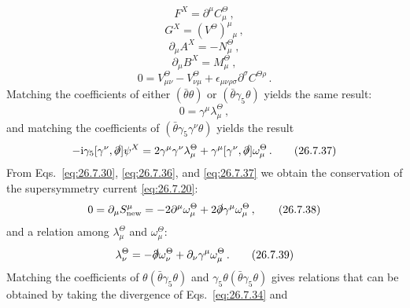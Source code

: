 \begin{equation}
  F^X=\partial^\mu C_\mu^\Theta\,,
  \tag{26.7.31}\label{eq:26.7.31}
\end{equation}
\begin{equation}
  G^X=(V^\Theta)^\mu{}_\mu\,,
  \tag{26.7.32}\label{eq:26.7.32}
\end{equation}
\begin{equation}
  \partial_\mu A^X=-N_\mu^\Theta\,,
  \tag{26.7.33}\label{eq:26.7.33}
\end{equation}
\begin{equation}
  \partial_\mu B^X=M_\mu^\Theta\,,
  \tag{26.7.34}\label{eq:26.7.34}
\end{equation}
\begin{equation}
  0=V_{\mu\nu}^\Theta-V_{\nu\mu}^\Theta
    +\epsilon_{\mu\nu\rho\sigma}\partial^\sigma C^{\Theta\rho}\,.
  \tag{26.7.35}\label{eq:26.7.35}
\end{equation}
Matching the coefficients of either \((\bar\theta\theta)\) or
\((\bar\theta\gamma_5\theta)\) yields the same result:
\begin{equation}
  0=\gamma^\mu\lambda_\mu^\Theta\,,
  \tag{26.7.36}\label{eq:26.7.36}
\end{equation}
and matching the coefficients of
\((\bar\theta\gamma_5\gamma^\nu\theta)\) yields the result
\begin{equation}
  -\ii\gamma_5[\gamma^\nu,\sl{\partial}]\psi^X
  =2\gamma^\mu\gamma^\nu\lambda_\mu^\Theta
   +\gamma^\mu[\gamma^\nu,\sl{\partial}]\omega_\mu^\Theta\,.
  \tag{26.7.37}\label{eq:26.7.37}
\end{equation}
From Eqs.~\eqref{eq:26.7.30}, \eqref{eq:26.7.36}, and
\eqref{eq:26.7.37} we obtain the conservation of the supersymmetry current
\eqref{eq:26.7.20}:
\begin{equation}
  0=\partial_\mu S_{\mathrm{new}}^\mu
  =-2\partial^\mu\omega_\mu^\Theta
   +2\sl{\partial}\gamma^\mu\omega_\mu^\Theta\,,
  \tag{26.7.38}\label{eq:26.7.38}
\end{equation}
and a relation among \(\lambda_\mu^\Theta\) and \(\omega_\mu^\Theta\):
\begin{equation}
  \lambda_\nu^\Theta
  =-\sl{\partial}\omega_\nu^\Theta
   +\partial_\nu\gamma^\mu\omega_\mu^\Theta\,.
  \tag{26.7.39}\label{eq:26.7.39}
\end{equation}
Matching the coefficients of
\(\theta(\bar\theta\gamma_5\theta)\) and
\(\gamma_5\theta(\bar\theta\gamma_5\theta)\) gives relations that can be
obtained by taking the divergence of Eqs.~\eqref{eq:26.7.34} and
